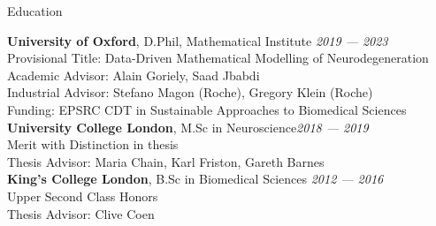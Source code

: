 \begin{rSection}{Education}

{\bf University of Oxford}, D.Phil, Mathematical Institute  \hfill {\em 2019 — 2023} \\
Provisional Title: Data-Driven Mathematical Modelling of Neurodegeneration \\
Academic Advisor: Alain Goriely, Saad Jbabdi \\
Industrial Advisor: Stefano Magon (Roche), Gregory Klein (Roche)\\
Funding: EPSRC CDT in Sustainable Approaches to Biomedical Sciences \\

{\bf University College London},  M.Sc in Neuroscience\hfill {\em 2018 — 2019} \\ 
Merit with Distinction in thesis \\
Thesis Advisor: Maria Chain, Karl Friston, Gareth Barnes \\

{\bf King's College London}, B.Sc in Biomedical Sciences \hfill {\em 2012 — 2016} \\ 
Upper Second Class Honors \\
Thesis Advisor: Clive Coen

\end{rSection}

